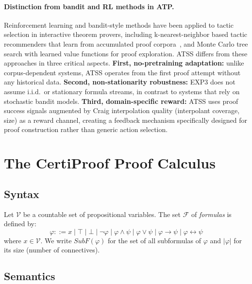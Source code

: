 \documentclass[acmtocl,review,anonymous]{acmart}
\newcommand{\dland}{\mathbin{\wedge}}
\newcommand{\dlor}{\mathbin{\vee}}
\newcommand{\dlnot}{\neg}
\newcommand{\dlimp}{\mathbin{\to}}
\newcommand{\dliff}{\mathbin{\leftrightarrow}}
\newcommand{\dlbot}{\bot}
\newcommand{\dltop}{\top}
\newcommand{\Fml}{\mathcal{F}}
\newcommand{\ATSS}{\textsc{ATSS}}
\begin{document}
\paragraph{Distinction from bandit and RL methods in ATP.}
Reinforcement learning and bandit-style methods have been applied
to tactic selection in interactive theorem provers, including
k-nearest-neighbor based tactic recommenders that learn from accumulated
proof corpora~\cite{TacticToe2017}, and Monte Carlo tree search with learned value functions
for proof exploration.  \ATSS{} differs from these approaches in three
critical aspects.  \textbf{First, no-pretraining adaptation:}
unlike corpus-dependent systems, \ATSS{} operates from the first proof
attempt without any historical data.  \textbf{Second, non-stationarity
robustness:} EXP3 does not assume i.i.d.\ or stationary formula streams,
in contrast to systems that rely on stochastic bandit models.
\textbf{Third, domain-specific
reward:} \ATSS{} uses proof success signals augmented by Craig
interpolation quality (interpolant coverage, size) as a reward
channel, creating a feedback mechanism specifically designed for
proof construction rather than generic action selection.

\section{The CertiProof Proof Calculus}
\label{sec:system}

\subsection{Syntax}

Let $\mathcal{V}$ be a countable set of propositional variables.
The set $\Fml$ of \emph{formulas} is defined by:
\begin{equation}
  \varphi ::= x \mid \dltop \mid \dlbot \mid \dlnot\varphi
    \mid \varphi \dland \psi \mid \varphi \dlor \psi
    \mid \varphi \dlimp \psi \mid \varphi \dliff \psi
\end{equation}
where $x \in \mathcal{V}$.
We write $\mathit{SubF}(\varphi)$ for the set of all subformulas
of $\varphi$ and $|\varphi|$ for its size (number of connectives).

\subsection{Semantics}
\end{document}

